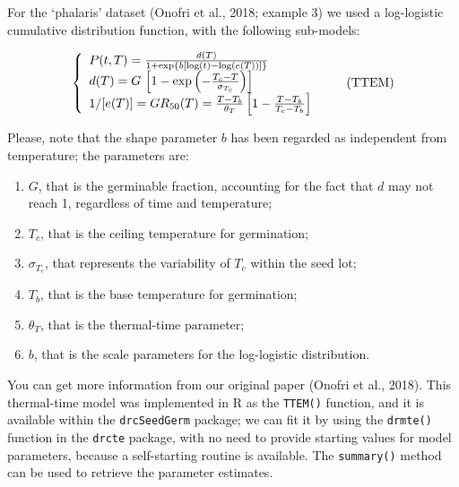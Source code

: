 \documentclass[
]{book}
\providecommand{\tightlist}{%
  \setlength{\itemsep}{0pt}\setlength{\parskip}{0pt}}
\begin{document}
For the `phalaris' dataset (Onofri et al., 2018; example 3) we used a log-logistic cumulative distribution function, with the following sub-models:

\[ \left\{ {\begin{array}{{l}}
P(t, T) = \frac{ d(T) }{1 + \exp \left\{ b \left[ \log(t) - \log( e(T) ) \right] \right\} } \\
d(T) = G \, \left[ 1 - \exp \left( - \frac{ T_c - T }{\sigma_{T_c}} \right) \right] \\
1/[e(T)] = GR_{50}(T) = \frac{T - T_b }{\theta_T} \left[1 - \frac{T - T_b}{T_c - T_b}\right]  \\
\end{array}} \right. \quad \quad (\textrm{TTEM})\]

Please, note that the shape parameter \(b\) has been regarded as independent from temperature; the parameters are:

\begin{enumerate}
\def\labelenumi{\arabic{enumi}.}
\tightlist
\item
  \(G\), that is the germinable fraction, accounting for the fact that \(d\) may not reach 1, regardless of time and temperature;
\item
  \(T_c\), that is the ceiling temperature for germination;
\item
  \(\sigma_{T_c}\), that represents the variability of \(T_c\) within the seed lot;
\item
  \(T_b\), that is the base temperature for germination;
\item
  \(\theta_T\), that is the thermal-time parameter;
\item
  \(b\), that is the scale parameters for the log-logistic distribution.
\end{enumerate}

You can get more information from our original paper (Onofri et al., 2018). This thermal-time model was implemented in R as the \texttt{TTEM()} function, and it is available within the \texttt{drcSeedGerm} package; we can fit it by using the \texttt{drmte()} function in the \texttt{drcte} package, with no need to provide starting values for model parameters, because a self-starting routine is available. The \texttt{summary()} method can be used to retrieve the parameter estimates.
\end{document}

